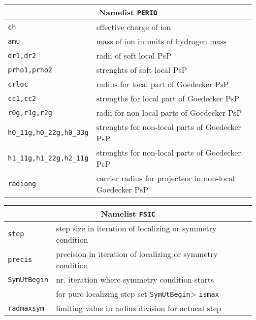 \documentclass[12pt]{article}
\begin{document}
\begin{tabular}{ll}
\hline
\multicolumn{2}{c}{Namelist {\tt PERIO}} in {\tt for005.<name>} \\
\hline
{\tt ch}& effective charge of ion \\
{\tt amu}& mass of ion in units of hydrogen mass\\
{\tt dr1,dr2}& radii of soft local PsP\\
{\tt prho1,prho2}& strenghts of soft local PsP\\
{\tt crloc}& radius for local part of Goedecker PsP\\
{\tt cc1,cc2}& strengths for local part of  Goedecker PsP\\
{\tt r0g,r1g,r2g}& radii for non-local parts of  Goedecker PsP\\
{\tt h0\_11g,h0\_22g,h0\_33g}& 
  strenghts for non-local parts of  Goedecker PsP\\
{\tt h1\_11g,h1\_22g,h2\_11g}&
  strenghts for non-local parts of  Goedecker PsP\\
{\tt radiong}& carrier radius for projecteor in non-local Goedecker PsP\\
\hline
\end{tabular}


\begin{tabular}{ll}
\hline
\multicolumn{2}{c}{Namelist {\tt FSIC}} in {\tt for005.<name>} \\
\hline
{\tt step}& step size in iteration of localizing or symmetry condition \\
{\tt precis}& precision in iteration of localizing or symmetry condition \\
{\tt SymUtBegin}& nr. iteration where symmetry condition starts\\
 &               for pure localizing step set {\tt  SymUtBegin}> {\tt ismax}\\
{\tt radmaxsym}& limiting value in radius division  for actucal step\\
\hline
\end{tabular}


\vspace*{2cm}
\end{document}
